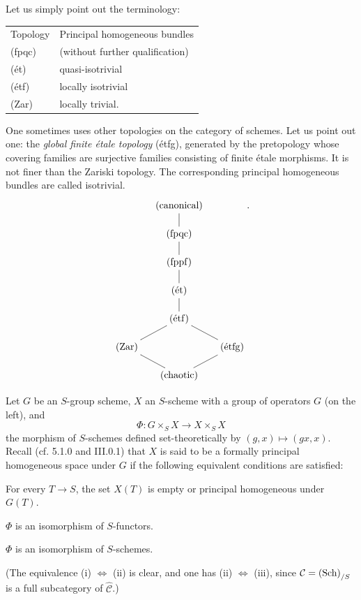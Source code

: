 Let us simply point out the terminology:
\begin{center}
\begin{tabular}{ll}
Topology & Principal homogeneous bundles\\
(fpqc) & (without further qualification)\\
(ét) & quasi-isotrivial\\
(étf) & locally isotrivial\\
(Zar) & locally trivial.
\end{tabular}
\end{center}
One sometimes uses other topologies
on the category of schemes.
Let us point out one: the
\emph{global finite étale topology}
(étfg), generated by the pretopology
whose covering families are
surjective families consisting of
finite étale morphisms.
It is not finer than the Zariski
topology. The corresponding
principal homogeneous bundles
are called \og isotrivial\fg.
\[
\xymatrix@R=1.3em@C=1.2em{
 & (\text{canonical})\ar@{-}[d] & \\
 & (\mathrm{fpqc})\ar@{-}[d] & \\
 & (\mathrm{fppf})\ar@{-}[d] & \\
 & (\mathrm{\acute et})\ar@{-}[d] & \\
 & (\mathrm{\acute etf})\ar@{-}[dl]\ar@{-}[dr] & \\
(\mathrm{Zar})\ar@{-}[dr] & & (\mathrm{\acute etfg})\ar@{-}[dl]\\
 & (\text{chaotic}) & }.
\]

Let \(G\) be an \(S\)-group scheme,
\(X\) an \(S\)-scheme with a group
of operators \(G\) (on the left), and
\[
\Phi:G\times_S X\longrightarrow X\times_S X
\]
the morphism of \(S\)-schemes
defined set-theoretically by
\((g,x)\mapsto(gx,x)\).
Recall (cf. 5.1.0 and III.0.1)
that \(X\) is said to be a
formally principal homogeneous
space under \(G\) if the following
equivalent conditions are satisfied:
\begin{enumeratei}
\item For every \(T\to S\), the
set \(X(T)\) is empty or principal
homogeneous under \(G(T)\).
\item \(\Phi\) is an isomorphism of \(S\)-functors.
\item \(\Phi\) is an isomorphism of \(S\)-schemes.
\end{enumeratei}
(The equivalence (i) \(\Leftrightarrow\)
(ii) is clear, and one has
(ii) \(\Leftrightarrow\) (iii),
since \(\mathcal C=\textup{(Sch)}_{/S}\)
is a full subcategory of
\(\widehat{\mathcal C}\).)

